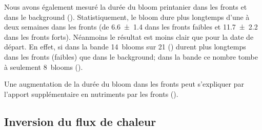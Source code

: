 Nous avons également mesuré la durée du bloom printanier dans les fronts et dans le background ().
Statistiquement, le bloom dure plus longtemps d'une à deux semaines dans les fronts (de \qty{6.6 \pm 1.4}{\jours} dans les fronts faibles et \qty{11.7 \pm 2.2}{\jours} dans les fronts forts).
Néanmoins le résultat est moins clair que pour la date de départ.
En effet, si dans la bande  14~blooms sur 21 () durent plus longtemps dans les fronts (faibles) que dans le background; dans la bande  ce nombre tombe à seulement 8~blooms ().

\begin{figure}
  \centering
  \label{fig:duree-bloom}
\end{figure}

Une augmentation de la durée du bloom dans les fronts peut s'expliquer par l'apport supplémentaire en nutriments par les fronts ().

\subsection{Inversion du flux de chaleur}
\label{sec:flux-chaleur}
